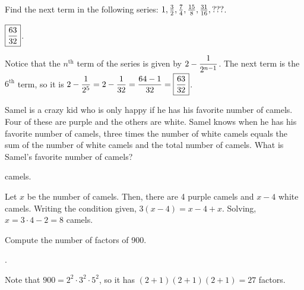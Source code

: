 \documentclass[11pt]{article}
\DeclareRobustCommand{\frac}[3][0pt]{%
  {\begingroup\hspace{#1}#2\hspace{#1}\endgroup\over\hspace{#1}#3\hspace{#1}}}
\begin{document}
\begin{problem}Find the next term in the following series: $1, \frac{3}{2}, \frac{7}{4}, \frac{15}{8}, \frac{31}{16}, ???$.
\end{problem}

\begin{answer} $\boxed{\displaystyle \frac{63}{32}}$. \end{answer}
\begin{solution}
Notice that the $n^{\text{th}}$ term of the series is given by $\displaystyle 2 - \frac{1}{2^{n-1}}$. The next term is the $6^{\text{th}}$ term, so it is $\displaystyle 2 - \frac{1}{2^{5}} = 2 - \frac{1}{32} = \frac{64 - 1}{32} = \boxed{\frac{63}{32}}$.
\end{solution}

\begin{problem} Samel is a crazy kid who is only happy if he has his favorite number of camels. Four of these are purple and the others are white. Samel knows when he has his favorite number of camels, three times the number of white camels equals the sum of the number of white camels and the total number of camels. What is Samel's favorite number of camels?
\end{problem}

\begin{answer}  camels. \end{answer}
\begin{solution}
Let $x$ be the number of camels. Then, there are 4 purple camels and $x - 4$ white camels. Writing the condition given, $3(x - 4) = x - 4 + x$. Solving, $x = 3 \cdot 4 - 2 = \boxed{8}$ camels.
\end{solution}

\begin{problem} Compute the number of factors of 900.
\end{problem}

\begin{answer} . \end{answer}
\begin{solution}
Note that $900 = 2^2 \cdot 3^2 \cdot 5^2$, so it has $(2 + 1)(2 + 1)(2 + 1) = \boxed{27}$ factors.
\end{solution}

\end{document}
